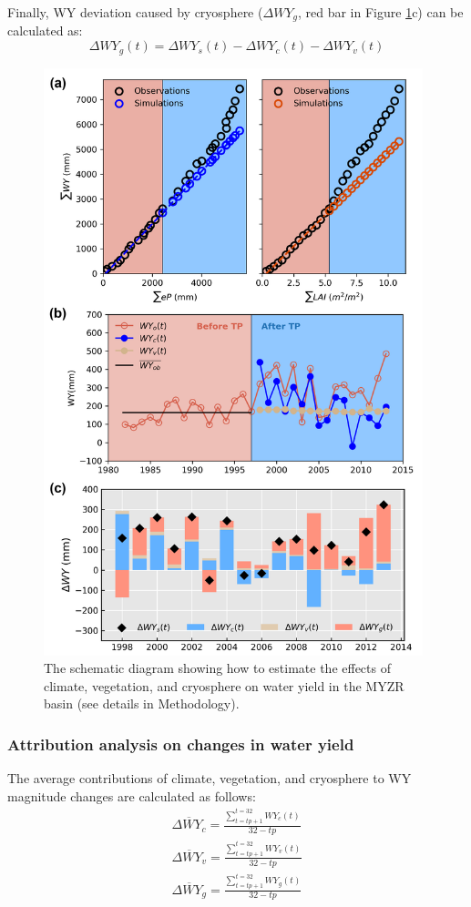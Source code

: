 \documentclass[hess, manuscript]{copernicus}
\begin{document}
Finally, WY deviation caused by cryosphere ($\Delta WY_g$, red bar in Figure \ref{fig:example_DMC}c) can be calculated as:
\begin{equation}
    \Delta WY_{g}(t)=\Delta WY_s(t)-\Delta WY_{c}(t)-\Delta WY_{v}(t)
\end{equation}

\begin{figure}[ht]
    \includegraphics[width=11cm]{02-figures/example_DMC.png}
    \caption
    {The schematic diagram showing how to estimate the effects of climate, vegetation, and cryosphere on water yield in the MYZR basin (see details in Methodology).}
    \label{fig:example_DMC}
\end{figure}

\subsubsection{Attribution analysis on changes in water yield}
The average contributions of climate, vegetation, and cryosphere to WY magnitude changes are calculated as follows:
\begin{equation}
    \begin{split}
        \overline{\Delta WY_{c}}=\frac{\sum_{t=tp+1}^{t=32} WY_{c}(t)}{32-tp}\\
        \overline{\Delta WY_{v}}=\frac{\sum_{t=tp+1}^{t=32} WY_{v}(t)}{32-tp}\\
        \overline{\Delta WY_{g}}=\frac{\sum_{t=tp+1}^{t=32} WY_{g}(t)}{32-tp}
    \end{split}
\end{equation}
\end{document}
